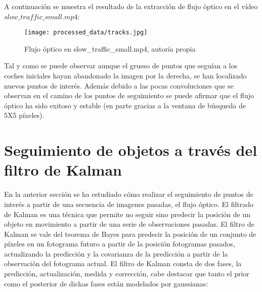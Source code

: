 \documentclass[a4paper,12pt]{article}
\begin{document}
{A continuación se muestra el resultado de la extracción de flujo óptico en el vídeo $slow\_traffic\_small.mp4$:

\vspace{0.5cm}

\begin{figure}[h!]
    \centering
    \texttt{[image: processed\_data/tracks.jpg]}
    \caption{Flujo óptico en slow\_traffic\_small.mp4, autoría propia}
    \label{fig:optical-flow}
\end{figure}

\vspace{0.5cm}

Tal y como se puede observar aunque el grueso de puntos que seguían a los coches iniciales hayan abandonado la imagen por la derecha, se han localizado nuevos puntos de interés. Además debido a las pocas convoluciones que se observan en el camino de los puntos de seguimiento
se puede afirmar que el flujo óptico ha sido exitoso y estable (en parte gracias a la ventana de búsqueda de 5X5 píxeles).

\newpage


\section{Seguimiento de objetos a través del filtro de Kalman}


\vspace{1cm}

En la anterior sección se ha estudiado cómo realizar el seguimiento de puntos de interés a partir de una secuencia de imagenes pasadas, el flujo óptico. El filtrado de Kalman es una técnica que permite no seguir sino predecir la posición de un objeto en movimiento a 
partir de una serie de observaciones pasadas. El filtro de Kalman se vale del teorema de Bayes para predecir la posición de un conjunto de píxeles en un fotograma futuro a partir de la posición fotogramas pasados, actualizando la predicción y la covarianza de la predicción
a partir de la observación del fotograma actual. El filtro de Kalman consta de dos fases, la predicción, actualización, medida y corrección, cabe destacar que tanto el prior como el posterior de dichas fases están modelados por gaussianas:

\vspace{0.5cm}

}
\end{document}
